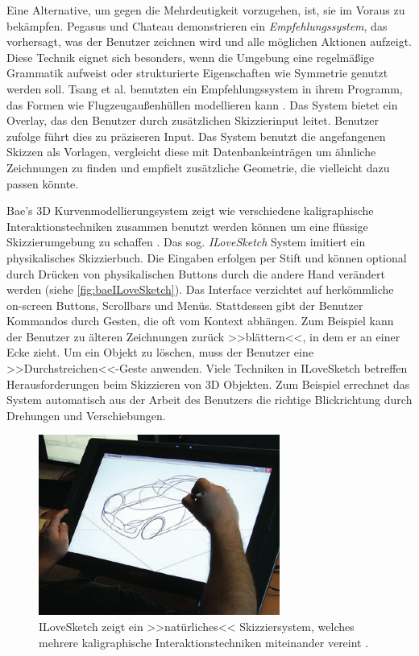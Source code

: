 Eine Alternative, um gegen die Mehrdeutigkeit vorzugehen, ist, sie im Voraus zu bekämpfen. Pegasus und Chateau \citep{Igarashi:2001,Igarashi:2003} demonstrieren ein \emph{Empfehlungssystem}, das vorhersagt, was der Benutzer zeichnen wird und alle möglichen Aktionen aufzeigt. Diese Technik eignet sich besonders, wenn die Umgebung eine regelmäßige Grammatik aufweist oder strukturierte Eigenschaften wie Symmetrie genutzt werden soll.
Tsang et al. benutzten ein Empfehlungssystem in ihrem Programm, das Formen wie Flugzeugaußenhüllen modellieren kann \citep{Tsang:2004}. Das System bietet ein Overlay, das den Benutzer durch zusätzlichen Skizzierinput leitet. Benutzer zufolge führt dies zu präziseren Input. Das System benutzt die angefangenen Skizzen als Vorlagen, vergleicht diese mit Datenbankeinträgen um ähnliche Zeichnungen zu finden und empfielt zusätzliche Geometrie, die vielleicht dazu passen könnte.

\medskip Bae's 3D Kurvenmodellierungsystem zeigt wie verschiedene kaligraphische Interaktionstechniken zusammen benutzt werden können um eine flüssige Skizzierumgebung zu schaffen \citep{Bae:2008}. Das sog. \emph{ILoveSketch} System imitiert ein physikalisches Skizzierbuch. Die Eingaben erfolgen per Stift und können optional durch Drücken von physikalischen Buttons durch die andere Hand verändert werden (siehe \autoref{fig:baeILoveSketch}). Das Interface verzichtet auf herkömmliche on-screen Buttons, Scrollbars und Menüs. Stattdessen gibt der Benutzer Kommandos durch Gesten, die oft vom Kontext abhängen. Zum Beispiel kann der Benutzer zu älteren Zeichnungen zurück >>blättern<<, in dem er an einer Ecke zieht. Um ein Objekt zu löschen, muss der Benutzer eine >>Durchstreichen<<-Geste anwenden. Viele Techniken in ILoveSketch betreffen Herausforderungen beim Skizzieren von 3D Objekten. Zum Beispiel errechnet das System automatisch aus der Arbeit des Benutzers die richtige Blickrichtung durch Drehungen und Verschiebungen.

\begin{figure}[bth]
	\begin{center}
	
	\includegraphics[width=0.7\linewidth]{gfx/baeILoveSketch}
	\caption[ILoveSketch \newline \citep{Johnson:2009}]{ILoveSketch zeigt ein >>natürliches<< Skizziersystem, welches mehrere kaligraphische Interaktionstechniken miteinander vereint \citep{Bae:2008}.}
	\label{fig:baeILoveSketch}
	\end{center}
\end{figure}

